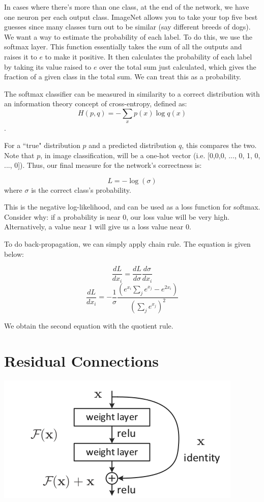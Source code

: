 \documentclass{article}
\begin{document}
In cases where there's more than one class, at the end of the network, we have one neuron per each output class. ImageNet allows you to take your top five best guesses since many classes turn out to be similar (say different breeds of dogs). We want a way to estimate the probability of each label. To do this, we use the softmax layer. This function essentially takes the sum of all the outputs and raises it to $e$ to make it positive. It then calculates the probability of each label by taking its value raised to $e$ over the total sum just calculated, which gives the fraction of a given class in the total sum. We can treat this as a probability.

The softmax classifier can be measured in similarity to a correct distribution with an information theory concept of cross-entropy, defined as:
$$ H(p, q) = -\sum_x p(x)\log q(x)$$.

For a ``true" distribution $p$ and a predicted distribution $q$, this compares the two. Note that $p$, in image classification, will be a one-hot vector (i.e. [0,0,0, ..., 0, 1, 0, ..., 0]). Thus, our final measure for the network's correctness is:

$$ L = - \log(\sigma) $$ where $\sigma$ is the correct class's probability.

This is the negative log-likelihood, and can be used as a loss function for softmax. Consider why: if a probability is near $0$, our loss value will be very high. Alternatively, a value near $1$ will give us a loss value near $0$.

To do back-propagation, we can simply apply chain rule. The equation is given below:

$$ \frac{dL}{dx_i} = \frac{dL}{d\sigma} \frac{d\sigma}{dx_i} $$
$$ \frac{dL}{dx_i} = -\frac{1}{\sigma}\frac{(e^{x_i}\sum_j e^{x_j}-e^{2x_i})}{(\sum_j e^{x_j})^2} $$

We obtain the second equation with the quotient rule.

\section{Residual Connections}
\begin{center}
\includegraphics[scale=0.5]{resnet}
\end{center}
\end{document}
